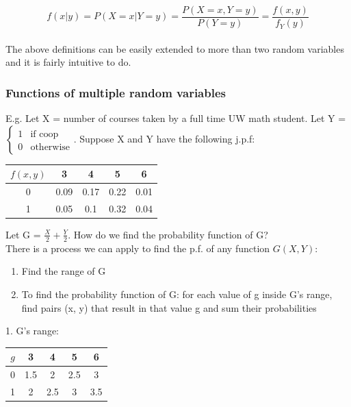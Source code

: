\documentclass[12pt, letterpaper]{article}
\begin{document}
\begin{equation}
f\left(x \vert y\right) = P\left(X = x \vert Y = y\right) = \frac{P\left(X = x, Y = y\right)}{P\left(Y = y\right)} = \frac{f\left(x, y\right)}{f_Y \left(y\right)}
\end{equation}\\

The above definitions can be easily extended to more than two random variables and it is fairly intuitive to do.\\

\subsubsection{Functions of multiple random variables}
E.g. Let X = number of courses taken by a full time UW math student. Let Y = $\begin{cases} 1 & \text{if coop}\\ 0 & \text{otherwise} \end{cases}$. Suppose X and Y have the following j.p.f:\\

\vspace{7mm}

\begin{tabular}{|c|c|c|c|c|}
\hline
$f\left(x, y\right)$ & 3 & 4 & 5 & 6\\ 
\hline
0 & 0.09 & 0.17 & 0.22 & 0.01\\
\hline
1 & 0.05 & 0.1 & 0.32 & 0.04\\
\hline
\end{tabular}

\vspace{7mm}
Let G = $\frac{X}{2} + \frac{Y}{2}$. How do we find the probability function of G?\\

There is a process we can apply to find the p.f. of any function \(G(X, Y)\):
\begin{enumerate}
\item Find the range of G
\item To find the probability function of G: for each value of g inside G's range, find pairs (x, y) that result in that value g and sum their probabilities
\end{enumerate}

1. G's range:

\begin{tabular}{|c|c|c|c|c|}
\hline
$g$ & 3 & 4 & 5 & 6\\ 
\hline
0 & 1.5 & 2 & 2.5 & 3\\
\hline
1 & 2 & 2.5 & 3 & 3.5\\
\hline
\end{tabular}
\end{document}
